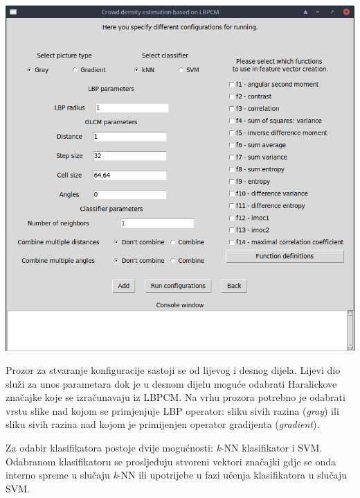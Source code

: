 \documentclass[times, utf8, zavrsni, numeric]{fer}
\begin{document}
\begin{minipage}{\linewidth}
\centering
\includegraphics[scale=0.35]{img/fvc2.png}
\end{minipage}

\bigbreak

Prozor za stvaranje konfiguracije sastoji se od lijevog i desnog dijela. 
Lijevi dio služi za unos parametara dok je u desnom dijelu moguće odabrati
Haralickove značajke koje se izračunavaju iz LBPCM. Na vrhu prozora potrebno
je odabrati vrstu slike nad kojom se primjenjuje LBP operator: sliku 
sivih razina (\textit{gray}) ili sliku sivih razina nad kojom je 
primijenjen operator gradijenta (\textit{gradient}). 

\bigbreak

Za odabir klasifikatora postoje dvije mogućnosti: \textit{k}-NN klasifikator i 
SVM. Odabranom klasifikatoru se prosljeđuju stvoreni vektori značajki gdje se onda
interno spreme u slučaju \textit{k}-NN ili upotrijebe u fazi učenja klasifikatora
u slučaju SVM. 
\end{document}
